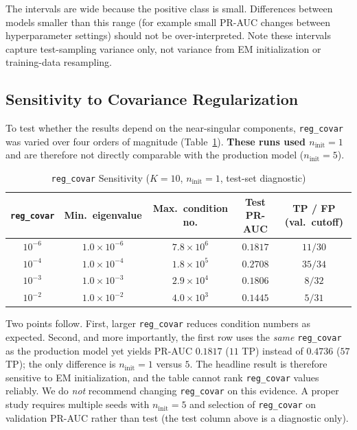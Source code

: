 \documentclass[11pt, a4paper]{article}
\begin{document}
The intervals are wide because the positive class is small. Differences between models smaller than this range (for example small PR-AUC changes between hyperparameter settings) should not be over-interpreted. Note these intervals capture test-sampling variance only, not variance from EM initialization or training-data resampling.

\subsection{Sensitivity to Covariance Regularization}
\label{sec:regcov}
To test whether the results depend on the near-singular components, \texttt{reg\_covar} was varied over four orders of magnitude (Table~\ref{tab:regcov}). \textbf{These runs used $n_{\text{init}}=1$} and are therefore not directly comparable with the production model ($n_{\text{init}}=5$).

\begin{table}[h!]
\centering
\caption{\texttt{reg\_covar} Sensitivity ($K=10$, $n_{\text{init}}=1$, test-set diagnostic)}
\vspace{0.2cm}
\renewcommand{\arraystretch}{1.25}
\small
\begin{tabular}{ccccc}
\toprule
\rowcolor{tableheader}
\textbf{\texttt{reg\_covar}} & \textbf{Min.\ eigenvalue} & \textbf{Max.\ condition no.} & \textbf{Test PR-AUC} & \textbf{TP / FP (val.\ cutoff)} \\
\midrule
$10^{-6}$ & $1.0\times10^{-6}$ & $7.8\times10^{6}$ & $0.1817$ & $11 / 30$ \\
\rowcolor{rowalt}
$10^{-4}$ & $1.0\times10^{-4}$ & $1.8\times10^{5}$ & $0.2708$ & $35 / 34$ \\
$10^{-3}$ & $1.0\times10^{-3}$ & $2.9\times10^{4}$ & $0.1806$ & $8 / 32$ \\
\rowcolor{rowalt}
$10^{-2}$ & $1.0\times10^{-2}$ & $4.0\times10^{3}$ & $0.1445$ & $5 / 31$ \\
\bottomrule
\end{tabular}
\label{tab:regcov}
\end{table}

Two points follow. First, larger \texttt{reg\_covar} reduces condition numbers as expected. Second, and more importantly, the first row uses the \emph{same} \texttt{reg\_covar} as the production model yet yields PR-AUC $0.1817$ ($11$ TP) instead of $0.4736$ ($57$ TP); the only difference is $n_{\text{init}}=1$ versus $5$. The headline result is therefore sensitive to EM initialization, and the table cannot rank \texttt{reg\_covar} values reliably. We do \emph{not} recommend changing \texttt{reg\_covar} on this evidence. A proper study requires multiple seeds with $n_{\text{init}}=5$ and selection of \texttt{reg\_covar} on validation PR-AUC rather than test (the test column above is a diagnostic only).
\end{document}
